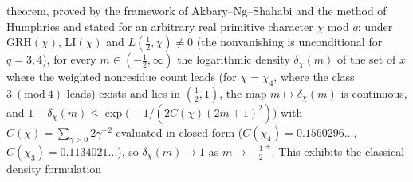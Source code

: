 theorem, proved by the framework of Akbary--Ng--Shahabi and the method
of Humphries and stated for an arbitrary real primitive character
$\chi$ mod $q$: under GRH$(\chi)$, LI$(\chi)$ and
$L(\tfrac12,\chi)\ne0$ (the nonvanishing is unconditional for
$q=3,4$), for every
$m\in(-\tfrac12,\infty)$ the logarithmic density $\delta_\chi(m)$ of
the set of $x$ where the weighted nonresidue count leads (for
$\chi=\chi_4$, where the class $3\ (\mathrm{mod}\ 4)$ leads) exists
and lies in
$(\tfrac12,1)$, the map $m\mapsto\delta_\chi(m)$ is continuous, and
$1-\delta_\chi(m)\le\exp\bigl(-1/(2C(\chi)(2m+1)^2)\bigr)$ with
$C(\chi)=\sum_{\gamma>0}2\gamma^{-2}$ evaluated in closed form
($C(\chi_4)=0.1560296\ldots$, $C(\chi_3)=0.1134021\ldots$), so
$\delta_\chi(m)\to1$ as $m\to-\tfrac12^{\,+}$. This exhibits the classical density formulation

